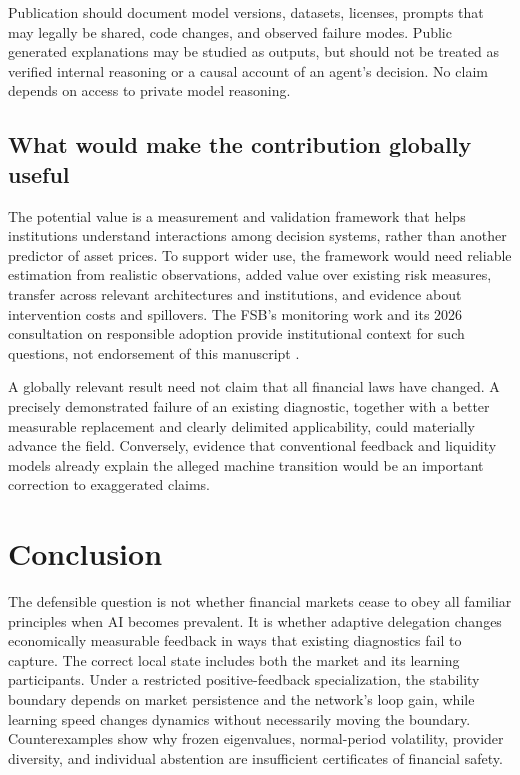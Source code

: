 \documentclass[11pt,a4paper]{article}
\theoremstyle{definition}
\theoremstyle{remark}
\begin{document}
Publication should document model versions, datasets, licenses, prompts that may legally be shared, code changes, and observed failure modes. Public generated explanations may be studied as outputs, but should not be treated as verified internal reasoning or a causal account of an agent's decision. No claim depends on access to private model reasoning.

\subsection{What would make the contribution globally useful}
The potential value is a measurement and validation framework that helps institutions understand interactions among decision systems, rather than another predictor of asset prices. To support wider use, the framework would need reliable estimation from realistic observations, added value over existing risk measures, transfer across relevant architectures and institutions, and evidence about intervention costs and spillovers. The FSB's monitoring work and its 2026 consultation on responsible adoption provide institutional context for such questions, not endorsement of this manuscript \citep{fsb2025,fsb2026}.

A globally relevant result need not claim that all financial laws have changed. A precisely demonstrated failure of an existing diagnostic, together with a better measurable replacement and clearly delimited applicability, could materially advance the field. Conversely, evidence that conventional feedback and liquidity models already explain the alleged machine transition would be an important correction to exaggerated claims.

\section{Conclusion}
The defensible question is not whether financial markets cease to obey all familiar principles when AI becomes prevalent. It is whether adaptive delegation changes economically measurable feedback in ways that existing diagnostics fail to capture. The correct local state includes both the market and its learning participants. Under a restricted positive-feedback specialization, the stability boundary depends on market persistence and the network's loop gain, while learning speed changes dynamics without necessarily moving the boundary. Counterexamples show why frozen eigenvalues, normal-period volatility, provider diversity, and individual abstention are insufficient certificates of financial safety.
\end{document}
